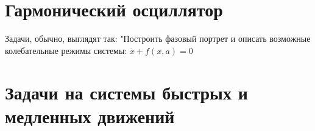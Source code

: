 \newcommand{\colontitulAutors}{astronom\_v\_cube et}
\newcommand{\colontitulYear}{2022}
\newcommand{\colontitulEducationalSubject}{Алгоритмы решения задач по теории колебаний}
\newcommand{\colontitulTeacher}{LaTex}




	\small
	\begin{multicols*}{2}

		\section{Гармонический осциллятор}

		Задачи, обычно, выглядят так:
		"Построить фазовый портрет и описать возможные колебательные режимы системы: $\ddot{x} + f(x, a) = 0 $

		\section{Задачи на системы быстрых и медленных движений}


	\end{multicols*}
